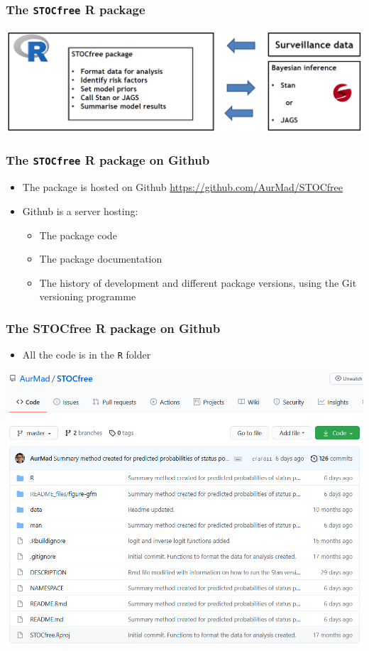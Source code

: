 \documentclass{beamer}
\begin{document}
\begin{frame}
\frametitle{The \texttt{STOCfree} R package}
\includegraphics[width=\textwidth]{imgs/STOCfree_package.png}
\end{frame}

\begin{frame}
\frametitle{The \texttt{STOCfree} R package on Github}
\begin{itemize}
 \item{The package is hosted on Github}
 \url{https://github.com/AurMad/STOCfree}
 \item{Github is a server hosting:}
 \begin{itemize}
  \item{The package code}
  \item{The package documentation}
  \item{The history of development and different package versions, using the Git versioning programme}
 \end{itemize}
\end{itemize}
\end{frame}

\begin{frame}
\frametitle{The STOCfree R package on Github}
\begin{itemize}
 \item{All the code is in the \texttt{R} folder}
\end{itemize}
\includegraphics[width=.9\textwidth]{imgs/STOCfree_Github.png}
\end{frame}
\end{document}
